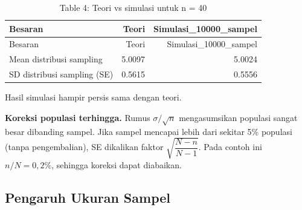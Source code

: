 \documentclass[
  indonesian,
  letterpaper,
]{book}
\begin{document}
\begin{longtable}[]{@{}lrr@{}}
\caption{Table 4: Teori vs simulasi untuk n = 40}\tabularnewline
\toprule\noalign{}
Besaran & Teori & Simulasi\_10000\_sampel \\
\midrule\noalign{}
\endfirsthead
\toprule\noalign{}
Besaran & Teori & Simulasi\_10000\_sampel \\
\midrule\noalign{}
\endhead
\bottomrule\noalign{}
\endlastfoot
Mean distribusi sampling & 5.0097 & 5.0024 \\
SD distribusi sampling (SE) & 0.5615 & 0.5556 \\
\end{longtable}

Hasil simulasi hampir persis sama dengan teori.

\textbf{Koreksi populasi terhingga.} Rumus \(\sigma/\sqrt{n}\)
mengasumsikan populasi sangat besar dibanding sampel. Jika sampel
mencapai lebih dari sekitar 5\% populasi (tanpa pengembalian), SE
dikalikan faktor \(\sqrt{\dfrac{N-n}{N-1}}\). Pada contoh ini
\(n/N = 0{,}2\%\), sehingga koreksi dapat diabaikan.

\subsection{Pengaruh Ukuran Sampel}\label{pengaruh-ukuran-sampel}
\end{document}
